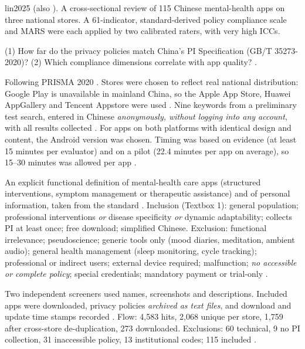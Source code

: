 \begin{papercard}{lin2025}
    (also ). A cross-sectional review of 115 Chinese mental-health apps on three national stores. A 61-indicator, standard-derived policy compliance scale and MARS were each applied by two calibrated raters, with very high ICCs.

 (1) How far do the privacy policies match China's PI Specification (GB/T 35273-2020)? (2) Which compliance dimensions correlate with app quality? .

 Following PRISMA 2020 . Stores were chosen to reflect real national distribution: Google Play is unavailable in mainland China, so the Apple App Store, Huawei AppGallery and Tencent Appstore were used . Nine keywords from a preliminary test search, entered in Chinese \emph{anonymously, without logging into any account}, with all results collected . For apps on both platforms with identical design and content, the Android version was chosen. Timing was based on evidence (at least 15 minutes per evaluator) and on a pilot (22.4 minutes per app on average), so 15--30 minutes was allowed per app .

 An explicit functional definition of mental-health care apps (structured interventions, symptom management or therapeutic assistance) and of personal information, taken from the standard . Inclusion (Textbox 1): general population; professional interventions \emph{or} disease specificity \emph{or} dynamic adaptability; collects PI at least once; free download; simplified Chinese. Exclusion: functional irrelevance; pseudoscience; generic tools only (mood diaries, meditation, ambient audio); general health management (sleep monitoring, cycle tracking); professional or indirect users; external device required; malfunction; \emph{no accessible or complete policy}; special credentials; mandatory payment or trial-only .

 Two independent screeners used names, screenshots and descriptions. Included apps were downloaded, privacy policies \emph{archived as text files}, and download and update time stamps recorded . Flow: 4{,}583 hits, 2{,}068 unique per store, 1{,}759 after cross-store de-duplication, 273 downloaded. Exclusions: 60 technical, 9 no PI collection, 31 inaccessible policy, 13 institutional codes; 115 included .


\end{papercard}
